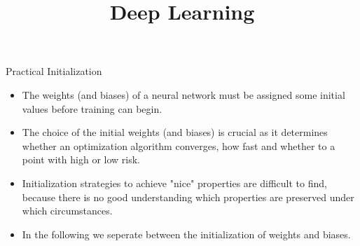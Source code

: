 




\newcommand{\titlefigure}{figure/spiral_planar_data/he_intro.png}
\newcommand{\learninggoals}{
  \item Why Initializaiton matters
  \item Weight Initializations
  \item Bias Initialization
}

\title{Deep Learning}
\date{}




\begin{vbframe} {Practical Initialization}
  \begin{itemize}
    \item The weights (and biases) of a neural network must be assigned some initial values before training can begin.
    \item The choice of the initial weights (and biases) is crucial as it determines whether an optimization algorithm converges, how fast and whether to a point with high or low risk. 
    \item Initialization strategies to achieve "nice" properties are difficult to find, because there is no good understanding which properties are preserved under which circumstances. 
    \item In the following we seperate between the initialization of weights and biases. 
  \end{itemize}
  \end{vbframe}
  
